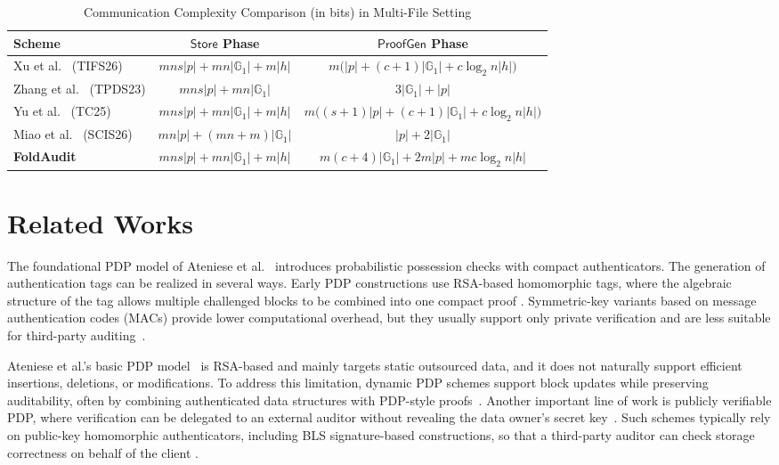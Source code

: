 \documentclass[lettersize,journal]{IEEEtran}
\newcommand{\GG}{\mathbb{G}}
\newcommand{\Store}{\mathsf{Store}}
\newcommand{\ProofGen}{\mathsf{ProofGen}}
\begin{document}
\begin{table}[!t]
\centering
\caption{Communication Complexity Comparison (in bits) in Multi-File Setting}
\label{tab:communication}
\renewcommand{\arraystretch}{1.3}
\begin{tabular}{l|c|c}
\hline
\textbf{Scheme} & \textbf{$\Store$ Phase} & \textbf{$\ProofGen$ Phase} \\
\hline
Xu et al.~\cite{XuTIFS26} (TIFS26) & $mns|p|+mn|\GG_1|+m|h|$& $m\bigl(|p|+(c+1)|\GG_1|+c\log_2 n|h|\bigr)$\\
Zhang et al.~\cite{ZhangTPDS23} (TPDS23) & $mns|p| + mn|\GG_1|$& $3|\GG_1| + |p|$\\
Yu et al.~\cite{YuTC25} (TC25) & $mns|p| + mn|\GG_1| + m|h|$& $m\big((s+1)|p| + (c+1)|\GG_1| + c\log_2 n|h|\big)$\\
Miao et al.~\cite{MiaoSCIS2026} (SCIS26) & $mn|p|+(mn+m)|\GG_1|$ & $|p|+2|\GG_1|$ \\
\hline
\textbf{FoldAudit} & $mns|p| + mn|\GG_1| + m|h|$& $m(c+4)|\GG_1|+2m|p|+mc\log_2 n|h|$ \\
\hline
\end{tabular}
\end{table}

\section{Related Works}
\label{sec:related_works}

The foundational PDP model of Ateniese et al.~\cite{Ateniese2007PDP} introduces probabilistic possession checks with compact authenticators.
The generation of authentication tags can be realized in several ways. Early PDP constructions use RSA-based homomorphic tags, where the algebraic structure of the tag allows multiple challenged blocks to be combined into one compact proof \cite{Ateniese2007PDP}. Symmetric-key variants based on message authentication codes (MACs) provide lower computational overhead, but they usually support only private verification and are less suitable for third-party auditing~\cite{Ateniese2008Scalable}.


Ateniese et al.'s basic PDP model~\cite{Ateniese2007PDP} is RSA-based and mainly targets static outsourced data, and it does not naturally support efficient insertions, deletions, or modifications. To address this limitation, dynamic PDP schemes support block updates while preserving auditability, often by combining authenticated data structures with PDP-style proofs~\cite{Ateniese2008Scalable,Erway2009DPDP,Duan2023DecentralizedAudit}. Another important line of work is publicly verifiable PDP, where verification can be delegated to an external auditor without revealing the data owner's secret key~\cite{Wang2011TPDS,Shu2022BlockchainAudit,Wang2014TCC,Chen2024ObjectAuditing,Chen2024ServerlessAuditing}. 
Such schemes typically rely on public-key homomorphic authenticators, including BLS signature-based constructions, so that a third-party auditor can check storage correctness on behalf of the client \cite{Shacham2008POR,Wang2013TC,Liu2025TLARDA}. 
\end{document}
